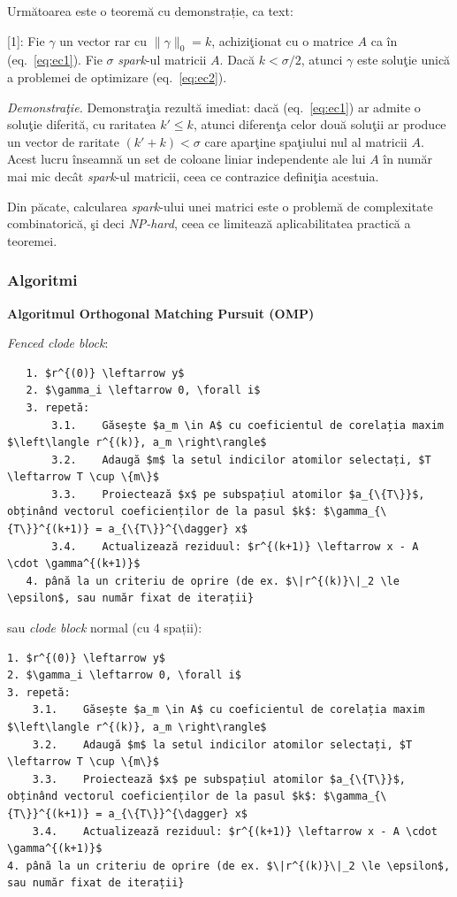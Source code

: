 \documentclass[]{article}
\begin{document}
Următoarea este o teoremă cu demonstrație, ca text:

\hypertarget{mylabel}{}
{[}1{]}: Fie \(\gamma\) un vector rar cu \(\|\gamma\|_0 = k\),
achiziţionat cu o matrice \(A\) ca în (eq.~\ref{eq:ec1}). Fie \(\sigma\)
\emph{spark}-ul matricii \(A\). Dacă \(k < \sigma / 2\), atunci
\(\gamma\) este soluţie unică a problemei de optimizare
(eq.~\ref{eq:ec2}).

\emph{Demonstraţie.} Demonstraţia rezultă imediat: dacă
(eq.~\ref{eq:ec1}) ar admite o soluţie diferită, cu raritatea
\(k' \leq k\), atunci diferenţa celor două soluţii ar produce un vector
de raritate \((k'+k) < \sigma\) care aparţine spaţiului nul al matricii
\(A\). Acest lucru înseamnă un set de coloane liniar independente ale
lui \(A\) în număr mai mic decât \emph{spark}-ul matricii, ceea ce
contrazice definiţia acestuia.

Din păcate, calcularea \emph{spark}-ului unei matrici este o problemă de
complexitate combinatorică, şi deci \emph{NP-hard}, ceea ce limitează
aplicabilitatea practică a teoremei.

\subsubsection{Algoritmi}\label{algoritmi}

\textbf{Algoritmul Orthogonal Matching Pursuit (OMP)}

\emph{Fenced clode block}:

\begin{verbatim}
   1. $r^{(0)} \leftarrow y$
   2. $\gamma_i \leftarrow 0, \forall i$
   3. repetă:  
       3.1.    Găsește $a_m \in A$ cu coeficientul de corelația maxim $\left\langle r^{(k)}, a_m \right\rangle$  
       3.2.    Adaugă $m$ la setul indicilor atomilor selectați, $T \leftarrow T \cup \{m\}$  
       3.3.    Proiectează $x$ pe subspațiul atomilor $a_{\{T\}}$, obținând vectorul coeficienților de la pasul $k$: $\gamma_{\{T\}}^{(k+1)} = a_{\{T\}}^{\dagger} x$  
       3.4.    Actualizează reziduul: $r^{(k+1)} \leftarrow x - A \cdot \gamma^{(k+1)}$
   4. până la un criteriu de oprire (de ex. $\|r^{(k)}\|_2 \le \epsilon$, sau număr fixat de iterații}  
\end{verbatim}

sau \emph{clode block} normal (cu 4 spații):

\begin{verbatim}
1. $r^{(0)} \leftarrow y$
2. $\gamma_i \leftarrow 0, \forall i$
3. repetă:  
    3.1.    Găsește $a_m \in A$ cu coeficientul de corelația maxim $\left\langle r^{(k)}, a_m \right\rangle$  
    3.2.    Adaugă $m$ la setul indicilor atomilor selectați, $T \leftarrow T \cup \{m\}$  
    3.3.    Proiectează $x$ pe subspațiul atomilor $a_{\{T\}}$, obținând vectorul coeficienților de la pasul $k$: $\gamma_{\{T\}}^{(k+1)} = a_{\{T\}}^{\dagger} x$  
    3.4.    Actualizează reziduul: $r^{(k+1)} \leftarrow x - A \cdot \gamma^{(k+1)}$
4. până la un criteriu de oprire (de ex. $\|r^{(k)}\|_2 \le \epsilon$, sau număr fixat de iterații}  
\end{verbatim}
\end{document}
